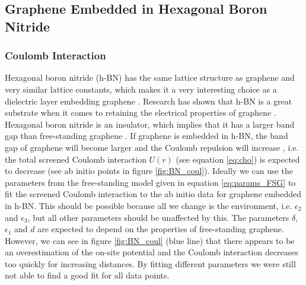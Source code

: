 
\subsection{Graphene Embedded in Hexagonal Boron Nitride}\label{boron_nitride}

\subsubsection{Coulomb Interaction}

Hexagonal boron nitride (h-BN) has the same lattice structure as graphene and very similar lattice constants, which makes it a very interesting choice as a dielectric layer embedding graphene \cite{Sarma2011,Wang2017}. Research has shown that h-BN is a great substrate when it comes to retaining the electrical properties of graphene \cite{Wang2017}. Hexagonal boron nitride is an insulator, which implies that it has a larger band gap than free-standing graphene \cite{Wang2017}. If graphene is embedded in h-BN, the band gap of graphene will become larger and the Coulomb repulsion will increase \cite{Wang2017}, i.e. the total screened Coulomb interaction $U(r)$ (see equation \ref{eq:cho}) is expected to decrease (see ab initio points in figure \ref{fig:BN_coul}). Ideally we can use the parameters from the free-standing model given in equation \ref{eq:params_FSG} to fit the screened Coulomb interaction to the ab initio data for graphene embedded in h-BN. This should be possible because all we change is the environment, i.e. $\epsilon_2$ and $\epsilon_3$, but all other parameters should be unaffected by this. The parameters $\delta$, $\epsilon_1$ and $d$ are expected to depend on the properties of free-standing graphene. However, we can see in figure \ref{fig:BN_coul} (blue line) that there appears to be an overestimation of the on-site potential and the Coulomb interaction decreases too quickly for increasing distances. By fitting different parameters we were still not able to find a good fit for all data points. 

